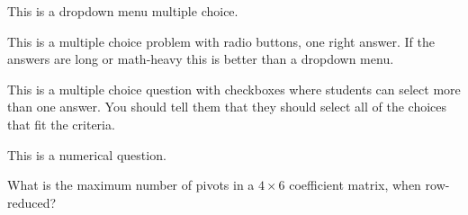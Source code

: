 

This is a dropdown menu multiple choice.  



\edXsolution{ 
}

\endedxproblem





This is a multiple choice problem with radio buttons, one right answer.  If the answers are 
long or math-heavy this is better than a dropdown menu.  


\edXsolution{ 
}

\endedxproblem



This is a multiple choice question with checkboxes 
where students can select more than one answer.  You should tell them
that they should select all of the choices that fit the criteria.  


\edXsolution{ 
}

\endedxproblem



This is a numerical question.  

What is the maximum number of pivots in a $4\times 6$ coefficient  matrix, when row-reduced?  




\edXsolution{ 
}

\endedxproblem




